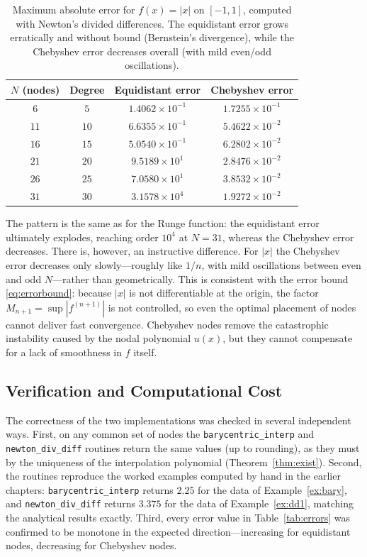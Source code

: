 \documentclass[12pt, a4paper]{article}
\theoremstyle{plain}
\theoremstyle{definition}
\theoremstyle{remark}
\begin{document}
\begin{table}[H]
    \centering
    \renewcommand{\arraystretch}{1.2}
    \begin{tabular}{c c c c}
        \toprule
        $N$ (nodes) & Degree & Equidistant error & Chebyshev error \\
        \midrule
        $6$  & $5$  & $1.4062 \times 10^{-1}$ & $1.7255 \times 10^{-1}$ \\
        $11$ & $10$ & $6.6355 \times 10^{-1}$ & $5.4622 \times 10^{-2}$ \\
        $16$ & $15$ & $5.0540 \times 10^{-1}$ & $6.2802 \times 10^{-2}$ \\
        $21$ & $20$ & $9.5189 \times 10^{1}$  & $2.8476 \times 10^{-2}$ \\
        $26$ & $25$ & $7.0580 \times 10^{1}$  & $3.8532 \times 10^{-2}$ \\
        $31$ & $30$ & $3.1578 \times 10^{4}$  & $1.9272 \times 10^{-2}$ \\
        \bottomrule
    \end{tabular}
    \caption{Maximum absolute error for $f(x)=|x|$ on $[-1,1]$, computed with Newton's divided differences. The equidistant error grows erratically and without bound (Bernstein's divergence), while the Chebyshev error decreases overall (with mild even/odd oscillations).}
    \label{tab:bernstein}
\end{table}

The pattern is the same as for the Runge function: the equidistant error ultimately explodes, reaching order $10^{4}$ at $N=31$, whereas the Chebyshev error decreases. There is, however, an instructive difference. For $|x|$ the Chebyshev error decreases only slowly---roughly like $1/n$, with mild oscillations between even and odd $N$---rather than geometrically. This is consistent with the error bound \eqref{eq:errorbound}: because $|x|$ is not differentiable at the origin, the factor $M_{n+1} = \sup |f^{(n+1)}|$ is not controlled, so even the optimal placement of nodes cannot deliver fast convergence. Chebyshev nodes remove the catastrophic instability caused by the nodal polynomial $u(x)$, but they cannot compensate for a lack of smoothness in $f$ itself.

\subsection{Verification and Computational Cost}

The correctness of the two implementations was checked in several independent ways. First, on any common set of nodes the \texttt{barycentric\_interp} and \texttt{newton\_div\_diff} routines return the same values (up to rounding), as they must by the uniqueness of the interpolation polynomial (Theorem~\ref{thm:exist}). Second, the routines reproduce the worked examples computed by hand in the earlier chapters: \texttt{barycentric\_interp} returns $2.25$ for the data of Example~\ref{ex:bary}, and \texttt{newton\_div\_diff} returns $3.375$ for the data of Example~\ref{ex:dd1}, matching the analytical results exactly. Third, every error value in Table~\ref{tab:errors} was confirmed to be monotone in the expected direction---increasing for equidistant nodes, decreasing for Chebyshev nodes.
\end{document}
